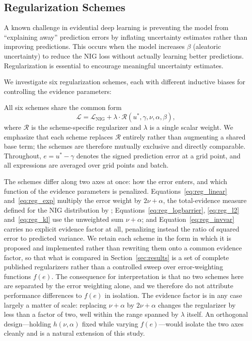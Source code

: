 \subsection{Regularization Schemes}

A known challenge in evidential deep learning \cite{amini2020deep,oh2022improving} is preventing the model from
``explaining away'' prediction errors by inflating uncertainty estimates rather than improving predictions. This occurs when the model increases $\beta$ 
(aleatoric uncertainty) to reduce the NIG loss without actually learning better predictions. Regularization is 
essential to encourage meaningful uncertainty estimates.

We investigate six regularization schemes, each with different inductive biases for controlling the evidence 
parameters:

All six schemes share the common form
\begin{equation}
    \mathcal{L} = \mathcal{L}_{\text{NIG}} + \lambda \cdot \mathcal{R}(u^*, \gamma, \nu, \alpha, \beta),
    \label{eq:reg_general}
\end{equation}
where $\mathcal{R}$ is the scheme-specific regularizer and $\lambda$ is a single scalar weight. We emphasize
that each scheme replaces $\mathcal{R}$ entirely rather than augmenting a shared base term; the schemes are
therefore mutually exclusive and directly comparable. Throughout, $e = u^* - \gamma$ denotes the signed
prediction error at a grid point, and all expressions are averaged over grid points and batch.

The schemes differ along two axes at once: how the error enters, and which function of the evidence parameters
is penalized. Equations~\eqref{eq:reg_linear} and~\eqref{eq:reg_exp} multiply the error weight by $2\nu + \alpha$,
the total-evidence measure defined for the NIG distribution by \cite{amini2020deep};
Equations~\eqref{eq:reg_logbarrier}, \eqref{eq:reg_l2} and~\eqref{eq:reg_kl} use the unweighted sum
$\nu + \alpha$; and Equation~\eqref{eq:reg_invvar} carries no explicit evidence factor at all, penalizing
instead the ratio of squared error to predicted variance. We retain each scheme in the form in which it is
proposed and implemented rather than rewriting them onto a common evidence factor, so that what is compared in
Section~\ref{sec:results} is a set of complete published regularizers rather than a controlled sweep over
error-weighting functions $f(e)$. The consequence for interpretation is that no two schemes here are separated
by the error weighting alone, and we therefore do not attribute performance differences to $f(e)$ in isolation.
The evidence factor is in any case largely a matter of scale: replacing $\nu + \alpha$ by $2\nu + \alpha$
changes the regularizer by less than a factor of two, well within the range spanned by $\lambda$ itself. An
orthogonal design---holding $h(\nu, \alpha)$ fixed while varying $f(e)$---would isolate the two axes cleanly and
is a natural extension of this study.

